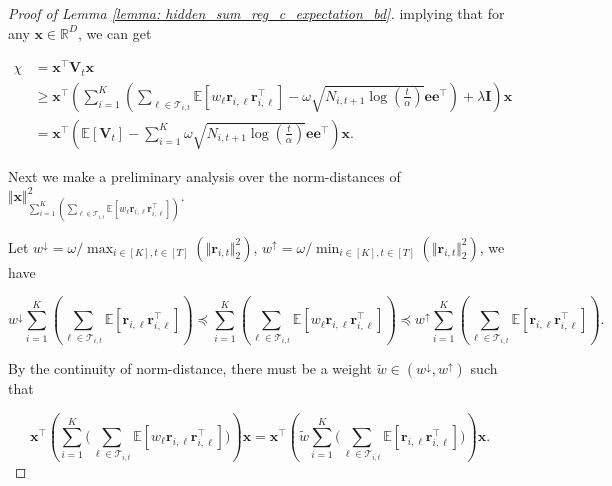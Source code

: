 \begin{proof}[Proof of Lemma \ref{lemma: hidden_sum_reg_c_expectation_bd}]
implying that for any $\boldsymbol{x} \in \mathbb{R}^{D}$, we can get

\begin{equation}
\begin{aligned}
\label{eq: expected_with_beta}
\chi
& = 
\boldsymbol{x}^{\top} 
\boldsymbol{V}_{t}
\boldsymbol{x} \\
& \geq
\boldsymbol{x}^{\top} 
\left( 
\sum_{i=1}^{K} \left(
\sum_{\ell \in \mathcal{T}_{i,t}} \mathbb{E} \left[ w_{\ell} \boldsymbol{r}_{i,\ell} \boldsymbol{r}_{i,\ell}^{\top} \right]
-
\omega \sqrt{ N_{i,t+1} \log \left( \frac{t}{\alpha} \right)} \boldsymbol{e e}^{\top}
\right)
+ \lambda \boldsymbol{I}
\right)
\boldsymbol{x} \\
& = 
\boldsymbol{x}^{\top} 
\left(
\mathbb{E} \left[\boldsymbol{V}_{t} \right]
- 
\sum_{i=1}^{K}
\omega \sqrt{ N_{i,t+1} \log \left( \frac{t}{\alpha} \right)} \boldsymbol{e e}^{\top}
\right)
\boldsymbol{x}
.
\end{aligned}
\end{equation}

Next we make a preliminary analysis over the norm-distances of $\Vert \boldsymbol{x} \Vert^2_{ \sum_{i=1}^{K} \left( \sum_{\ell \in \mathcal{T}_{i,t}} \mathbb{E} \left[ w_{\ell} \boldsymbol{r}_{i,\ell} \boldsymbol{r}_{i,\ell}^{\top} \right]
\right) }$.

Let $w^{\downarrow} = \omega / \max_{i\in[K], t\in[T]}(\Vert \boldsymbol{r}_{i,t} \Vert_2^2)$, $w^{\uparrow} = \omega/\min_{i\in[K], t\in[T]}(\Vert \boldsymbol{r}_{i,t} \Vert_2^2)$, we have 

\[
w^{\downarrow}
\sum_{i=1}^{K} \left( \sum_{\ell \in \mathcal{T}_{i,t}} \mathbb{E} \left[\boldsymbol{r}_{i,\ell} \boldsymbol{r}_{i,\ell}^{\top} \right]
\right) 
\preceq
\sum_{i=1}^{K} \left( \sum_{\ell \in \mathcal{T}_{i,t}} \mathbb{E} \left[ w_{\ell} \boldsymbol{r}_{i,\ell} \boldsymbol{r}_{i,\ell}^{\top} \right]
\right) 
\preceq
w^{\uparrow}
\sum_{i=1}^{K} \left( \sum_{\ell \in \mathcal{T}_{i,t}} \mathbb{E} \left[\boldsymbol{r}_{i,\ell} \boldsymbol{r}_{i,\ell}^{\top} \right]
\right).
\]

By the continuity of norm-distance, there must be a weight $ \tilde{w} \in (w^{\downarrow}, w^{\uparrow})$ such that

\[
\boldsymbol{x}^{\top}
\left( 
\sum_{i=1}^{K} \Big( \sum_{\ell \in \mathcal{T}_{i,t}} \mathbb{E} \left[ w_{\ell} \boldsymbol{r}_{i,\ell} \boldsymbol{r}_{i,\ell}^{\top} \right]
\Big)
\right)
\boldsymbol{x}
=
\boldsymbol{x}^{\top}
\left( 
\tilde{w}
\sum_{i=1}^{K} \Big( \sum_{\ell \in \mathcal{T}_{i,t}} \mathbb{E} \left[ \boldsymbol{r}_{i,\ell} \boldsymbol{r}_{i,\ell}^{\top} \right]
\Big)
\right)
\boldsymbol{x}.
\]


\end{proof}
